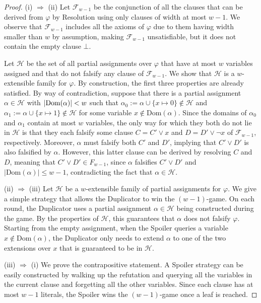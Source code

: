 \begin{proof}
    (i) $\Rightarrow$ (ii) Let $\mathcal{F}_{w-1}$ be the conjunction of all the clauses that can be derived from $\varphi$ by Resolution using only clauses of width at most $w-1$. We observe that $\mathcal{F}_{w-1}$ includes all the axioms of $\varphi$ due to them having width smaller than $w$ by assumption, making $\mathcal{F}_{w-1}$ unsatisfiable, but it does not contain the empty clause $\bot$.

    Let $\mathcal{H}$ be the set of all partial assignments over $\varphi$ that have at most $w$ variables assigned and that do not falsify any clause of $\mathcal{F}_{w-1}$. We show that $\mathcal{H}$ is a $w$-extensible family for $\varphi$. By construction, the first three properties are already satisfied. By way of contradiction, suppose that there is a partial assignment $\alpha \in \mathcal{H}$ with $\left|\mathrm{Dom}(\alpha)\right| < w$ such that $\alpha_0 := \alpha \cup \{x \mapsto 0\} \notin \mathcal{H}$ and $\alpha_1 := \alpha \cup \{x \mapsto 1\} \notin \mathcal{H}$ for some variable $x \notin \mathrm{Dom}(\alpha)$. Since the domains of $\alpha_0$ and $\alpha_1$ contain at most $w$ variables, the only way for which they both do not lie in $\mathcal{H}$ is that they each falsify some clause $C = C' \lor x$ and $D = D' \lor \lnot x$ of $\mathcal{F}_{w-1}$, respectively. Moreover, $\alpha$ must falsify both $C'$ and $D'$, implying that $C' \lor D'$ is also falsified by $\alpha$. However, this latter clause can be derived by resolving $C$ and $D$, meaning that $C' \lor D' \in F_{w-1}$, since $\alpha$ falsifies $C' \lor D'$ and $|\mathrm{Dom}(\alpha)| \leq w-1$, contradicting the fact that $\alpha \in \mathcal{H}$.

    (ii) $\Rightarrow$ (iii) Let $\mathcal{H}$ be a $w$-extensible family of partial assignments for $\varphi$. We give a simple strategy that allows the Duplicator to win the $(w-1)$-game. On each round, the Duplicator uses a partial assignment $\alpha \in \mathcal{H}$ being constructed during the game. By the properties of $\mathcal{H}$, this guarantees that $\alpha$ does not falsify $\varphi$. Starting from the empty assignment, when the Spoiler queries a variable $x \notin \mathrm{Dom}(\alpha)$, the Duplicator only needs to extend $\alpha$ to one of the two extensions over $x$ that is guaranteed to be in $\mathcal{H}$.

    (iii) $\Rightarrow$ (i) We prove the contrapositive statement. A Spoiler strategy can be easily constructed by walking up the refutation and querying all the variables in the current clause and forgetting all the other variables. Since each clause has at most $w-1$ literals, the Spoiler wins the $(w-1)$-game once a leaf is reached.
\end{proof}

\cleardoublepage
